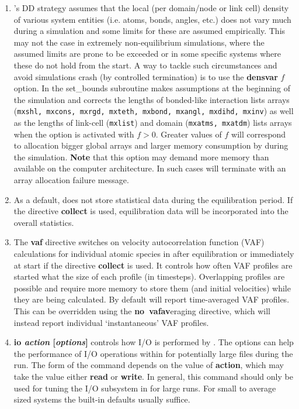 \begin{enumerate}
\item \D's DD strategy assumes that the local (per domain/node or
link cell) density of various system entities (i.e. atoms, bonds,
angles, etc.) does not vary much during a simulation and some
limits for these are assumed empirically.  This may not the case in
extremely non-equilibrium simulations, where the assumed limits
are prone to be exceeded or in some specific systems where these
do not hold from the start.  A way to tackle such circumstances and
avoid simulations crash (by controlled termination) is to use the
{\bf densvar} $f$ option.  In the {\sc set\_bounds} subroutine \D
makes assumptions at the beginning of the simulation and corrects
the lengths of bonded-like interaction lists arrays ({\tt mxshl,
mxcons, mxrgd, mxteth, mxbond, mxangl, mxdihd, mxinv}) as well as the
lengths of link-cell ({\tt mxlist}) and domain ({\tt mxatms, mxatdm})
lists arrays when the option is activated with $f > 0$.  Greater
values of $f$ will correspond to allocation bigger global arrays
and larger memory consumption by \D during the simulation.
{\bf Note} that this option may demand more memory than available
on the computer architecture.  In such cases \D will terminate
with an array allocation failure message.

\item As a default, \D does not store statistical data during the
equilibration period.  If the directive {\bf collect} is used,
equilibration data will be incorporated into the overall statistics.

\item The {\bf vaf} directive switches on velocity autocorrelation
function (VAF) calculations for individual atomic species in \D
after equilibration or immediately at start if the directive {\bf collect}
is used.  It controls how often VAF profiles are started what the size
of each profile (in timesteps).  Overlapping profiles are possible and
require more memory to store them (and initial velocities) while they
are being calculated.  By default \D will report time-averaged VAF profiles.
This can be overridden using the {\bf no~vafav}eraging directive, which
will instead report individual `instantaneous' VAF profiles.

\item {\bf io {\em action} [{\em options}]} controls how I/O is performed
by \D.  The options can help the performance of I/O
operations within \D for potentially large files during the run.
The form of the command depends on the value of {\bf action},
which may take the value either {\bf read} or {\bf write}.
In general, this command should only be used for tuning the
I/O subsystem in \D for large runs.  For small to average
sized systems the built-in defaults usually suffice.


\end{enumerate}
